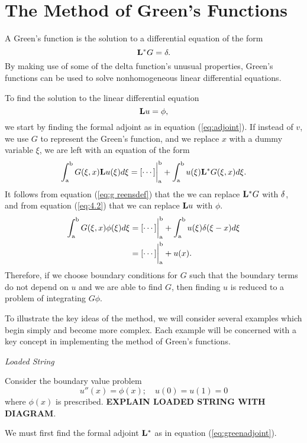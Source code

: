 \section{The Method of Green's Functions}
\setcounter{example}{0}
A Green's function is the solution to a differential equation of the form
\begin{equation} \label{eq:greensdef}
    \mathrm{\bf{L^*}} G = \delta.
\end{equation}
By making use of some of the delta function's unusual properties, Green's functions can be used to solve nonhomogeneous linear differential equations.

To find the solution to the linear differential equation
\begin{equation} \label{eq:4.2}
    \mathrm{\bf{L}}u=\phi,
\end{equation}
we start by finding the formal adjoint as in equation (\ref{eq:adjoint}). If instead of \(v\), we use \(G\) to represent the Green's function, and we replace \(x\) with a dummy variable \(\xi\), we are left with an equation of the form
\begin{equation} \label{eq:greenadjoint}
    \int_\mathrm{a}^\mathrm{b} G(\xi, x)\mathrm{\bf{L}}u(\xi) d\xi = [\cdots]\biggr\rvert_\mathrm{a}^\mathrm{b} + \int_\mathrm{a}^\mathrm{b} u(\xi)\mathrm{\bf{L^*}}G(\xi,x) d\xi.
\end{equation} 
It follows from equation (\ref{eq:g reensdef}) that the we can replace \(\mathrm{\bf{L^*}}G\) with \(\delta\), and from equation (\ref{eq:4.2}) that we can replace \(\mathrm{\bf{L}}u\) with \(\phi\). 
\begin{equation}
    \begin{split}
        \int_\mathrm{a}^\mathrm{b} G(\xi,x)\phi(\xi) d\xi &= [\cdots]\biggr\rvert_\mathrm{a}^\mathrm{b} + \int_\mathrm{a}^\mathrm{b} u(\xi)\delta(\xi-x) d\xi\\
        &=[\cdots]\biggr\rvert_\mathrm{a}^\mathrm{b} + u(x).
    \end{split}
\end{equation}
Therefore, if we choose boundary conditions for \(G\) such that the boundary terms do not depend on \(u\) and we are able to find \(G\), then finding \(u\) is reduced to a problem of integrating \(G\phi\). 

To illustrate the key ideas of the method, we will consider several examples which begin simply and become more complex. Each example will be concerned with a key concept in implementing the method of Green's functions.
\begin{example}
    \textit{Loaded String}
    
    Consider the boundary value problem
    \begin{equation}
        u''(x) = \phi(x);\quad u(0)=u(1)=0
    \end{equation}
    where \(\phi(x)\) is prescribed. \textbf{EXPLAIN LOADED STRING WITH DIAGRAM}. 
    
    We must first find the formal adjoint \(\mathrm{\bf{L^*}}\) as in equation (\ref{eq:greenadjoint}). 
\end{example}
